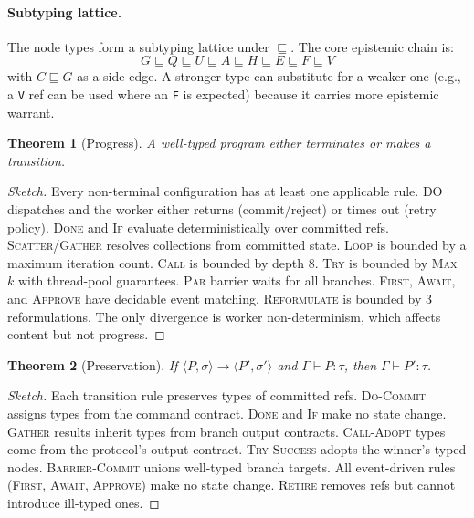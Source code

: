 \documentclass[11pt,a4paper]{article}
\newtheorem{theorem}{Theorem}
\begin{document}
\paragraph{Subtyping lattice.}
The node types form a subtyping lattice under $\sqsubseteq$.
The core epistemic chain is:
\[
G \sqsubseteq Q \sqsubseteq U \sqsubseteq A \sqsubseteq H \sqsubseteq E \sqsubseteq F \sqsubseteq V
\]
with $C \sqsubseteq G$ as a side edge.
A stronger type can substitute for a weaker one (e.g., a \texttt{V} ref can be used where an \texttt{F} is expected) because it carries more epistemic warrant.

\begin{theorem}[Progress]
A well-typed program either terminates or makes a transition.
\end{theorem}

\begin{proof}[Sketch]
Every non-terminal configuration has at least one applicable rule.
\textsc{DO} dispatches and the worker either returns (commit/reject) or times out (retry policy).
\textsc{Done} and \textsc{If} evaluate deterministically over committed refs.
\textsc{Scatter}/\textsc{Gather} resolves collections from committed state.
\textsc{Loop} is bounded by a maximum iteration count.
\textsc{Call} is bounded by depth 8.
\textsc{Try} is bounded by \textsc{Max}~$k$ with thread-pool guarantees.
\textsc{Par} barrier waits for all branches.
\textsc{First}, \textsc{Await}, and \textsc{Approve} have decidable event matching.
\textsc{Reformulate} is bounded by 3 reformulations.
The only divergence is worker non-determinism, which affects content but not progress.
\end{proof}

\begin{theorem}[Preservation]
If $\langle P, \sigma \rangle \to \langle P', \sigma' \rangle$ and $\Gamma \vdash P : \tau$, then $\Gamma \vdash P' : \tau$.
\end{theorem}

\begin{proof}[Sketch]
Each transition rule preserves types of committed refs.
\textsc{Do-Commit} assigns types from the command contract.
\textsc{Done} and \textsc{If} make no state change.
\textsc{Gather} results inherit types from branch output contracts.
\textsc{Call-Adopt} types come from the protocol's output contract.
\textsc{Try-Success} adopts the winner's typed nodes.
\textsc{Barrier-Commit} unions well-typed branch targets.
All event-driven rules (\textsc{First}, \textsc{Await}, \textsc{Approve}) make no state change.
\textsc{Retire} removes refs but cannot introduce ill-typed ones.
\end{proof}
\end{document}
